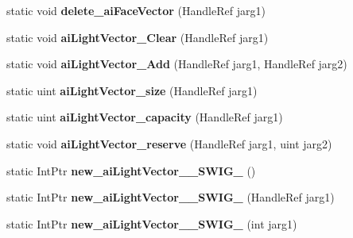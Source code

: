 \begin{DoxyCompactItemize}
\item 
\hypertarget{class_assimp_p_i_n_v_o_k_e_a042a9d6ed5780203563dab7d35766b75}{static void {\bfseries delete\+\_\+ai\+Face\+Vector} (Handle\+Ref jarg1)}\label{class_assimp_p_i_n_v_o_k_e_a042a9d6ed5780203563dab7d35766b75}

\item 
\hypertarget{class_assimp_p_i_n_v_o_k_e_a32bce9e95f8b5e40f593ac246d9f18f8}{static void {\bfseries ai\+Light\+Vector\+\_\+\+Clear} (Handle\+Ref jarg1)}\label{class_assimp_p_i_n_v_o_k_e_a32bce9e95f8b5e40f593ac246d9f18f8}

\item 
\hypertarget{class_assimp_p_i_n_v_o_k_e_a14fd00c5223d51dc4e306e5ad1f66079}{static void {\bfseries ai\+Light\+Vector\+\_\+\+Add} (Handle\+Ref jarg1, Handle\+Ref jarg2)}\label{class_assimp_p_i_n_v_o_k_e_a14fd00c5223d51dc4e306e5ad1f66079}

\item 
\hypertarget{class_assimp_p_i_n_v_o_k_e_a9c7da20f909436613dea4fa5e439ac6a}{static uint {\bfseries ai\+Light\+Vector\+\_\+size} (Handle\+Ref jarg1)}\label{class_assimp_p_i_n_v_o_k_e_a9c7da20f909436613dea4fa5e439ac6a}

\item 
\hypertarget{class_assimp_p_i_n_v_o_k_e_a39107716a378c8e9fbb7825fdae02e40}{static uint {\bfseries ai\+Light\+Vector\+\_\+capacity} (Handle\+Ref jarg1)}\label{class_assimp_p_i_n_v_o_k_e_a39107716a378c8e9fbb7825fdae02e40}

\item 
\hypertarget{class_assimp_p_i_n_v_o_k_e_a7414f4933e258685a2870e5ed1cbfc28}{static void {\bfseries ai\+Light\+Vector\+\_\+reserve} (Handle\+Ref jarg1, uint jarg2)}\label{class_assimp_p_i_n_v_o_k_e_a7414f4933e258685a2870e5ed1cbfc28}

\item 
\hypertarget{class_assimp_p_i_n_v_o_k_e_a463b5018ab989b3dc3d17f8081ad6131}{static Int\+Ptr {\bfseries new\+\_\+ai\+Light\+Vector\+\_\+\+\_\+\+S\+W\+I\+G\+\_} ()}\label{class_assimp_p_i_n_v_o_k_e_a463b5018ab989b3dc3d17f8081ad6131}

\item 
\hypertarget{class_assimp_p_i_n_v_o_k_e_abc8ccba7003627da5a0566ef51857487}{static Int\+Ptr {\bfseries new\+\_\+ai\+Light\+Vector\+\_\+\+\_\+\+S\+W\+I\+G\+\_} (Handle\+Ref jarg1)}\label{class_assimp_p_i_n_v_o_k_e_abc8ccba7003627da5a0566ef51857487}

\item 
\hypertarget{class_assimp_p_i_n_v_o_k_e_a3d0ca15de167605be22158da2e1ebac8}{static Int\+Ptr {\bfseries new\+\_\+ai\+Light\+Vector\+\_\+\+\_\+\+S\+W\+I\+G\+\_} (int jarg1)}\label{class_assimp_p_i_n_v_o_k_e_a3d0ca15de167605be22158da2e1ebac8}


\end{DoxyCompactItemize}
